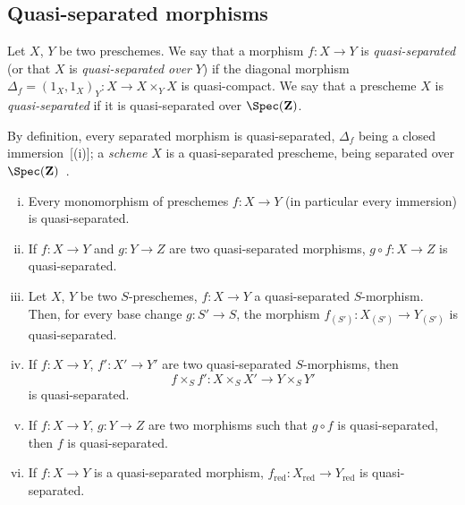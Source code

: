 \subsection{Quasi-separated morphisms}
\label{subsection:IV.1.2}

\begin{definition}[1.2.1]
\label{IV.1.2.1}
Let $X$, $Y$ be two preschemes. We say that a morphism $f:X\to Y$ is
\emph{quasi-separated} (or that $X$ is \emph{quasi-separated over} $Y$) if the diagonal morphism $\Delta_f=(1_X,1_X)_Y:X\to X\times_Y X$
is quasi-compact. We say that a prescheme $X$ is \emph{quasi-separated} if it is quasi-separated over $\Spec(\mathbf{Z})$.
\end{definition}

By definition, every separated morphism is quasi-separated, $\Delta_f$ being a closed immersion~[(i)]; a \emph{scheme} $X$ is a quasi-separated prescheme, being separated over
$\Spec(\mathbf{Z})$~.

\begin{proposition}[1.2.2]
\label{IV.1.2.2}
\medskip\noindent
\begin{enumerate}[(i)]
  \item Every monomorphism of preschemes $f:X\to Y$ \textnormal{(}in particular
    every immersion\textnormal{)} is quasi-separated.
  \item If $f:X\to Y$ and $g:Y\to Z$ are two quasi-separated morphisms, $g\circ f:X\to Z$ is
    quasi-separated.
  \item Let $X$, $Y$ be two $S$-preschemes, $f:X\to Y$ a quasi-separated $S$-morphism. Then,
    for every base change $g:S'\to S$, the morphism $f_{(S')}:X_{(S')}\to Y_{(S')}$ is quasi-separated.
  \item If $f:X\to Y$, $f':X'\to Y'$ are two quasi-separated $S$-morphisms, then
    \[
      f\times_S f': X\times_S X'\to Y\times_S Y'
    \]
    is quasi-separated.
  \item If $f:X\to Y$, $g:Y\to Z$ are two morphisms such that $g\circ f$ is quasi-separated, then $f$
    is quasi-separated.
  \item If $f:X\to Y$ is a quasi-separated morphism, $f_{\mathrm{red}}:X_{\mathrm{red}}\to Y_{\mathrm{red}}$ is quasi-separated.
\end{enumerate}
\end{proposition}

